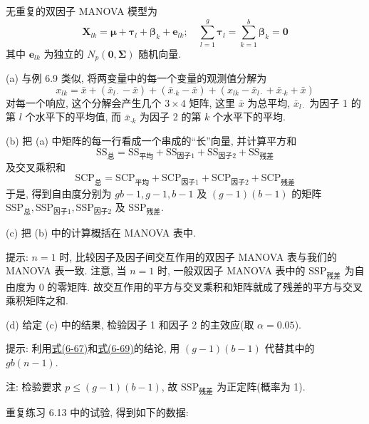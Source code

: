 
无重复的双因子 MANOVA 模型为
\[
\mathbf{X}_{lk}=\boldsymbol{\mu}+\boldsymbol{\tau}_l+\boldsymbol{\beta}_k+\mathbf{e}_{lk};\quad \sum_{l=1}^{g}\boldsymbol{\tau}_l=\sum_{k=1}^{b}\boldsymbol{\beta}_k=\mathbf{0}
\]
其中 $\mathbf{e}_{lk}$ 为独立的 $N_p(\mathbf{0},\boldsymbol{\Sigma})$ 随机向量.

\noindent (a) 与例 6.9 类似, 将两变量中的每一个变量的观测值分解为
\[
x_{lk}=\bar{x}+(\bar{x}_{l\cdot}-\bar{x})+(\bar{x}_{\cdot k}-\bar{x})+(x_{lk}-\bar{x}_{l\cdot}+\bar{x}_{\cdot k}+\bar{x})
\]
对每一个响应, 这个分解会产生几个 $3\times 4$ 矩阵, 这里 $\bar{x}$ 为总平均, $\bar{x}_{l\cdot}$ 为因子 1 的第 $l$ 个水平下的平均值, 而 $\bar{x}_{\cdot k}$ 为因子 2 的第 $k$ 个水平下的平均.

\noindent (b) 把 (a) 中矩阵的每一行看成一个串成的“长”向量, 并计算平方和
\[
\mathrm{SS}_{\text{总}}=\mathrm{SS}_{\text{平均}}+\mathrm{SS}_{\text{因子}1}+\mathrm{SS}_{\text{因子}2}+\mathrm{SS}_{\text{残差}}
\]
及交叉乘积和
\[
\mathrm{SCP}_{\text{总}}=\mathrm{SCP}_{\text{平均}}+\mathrm{SCP}_{\text{因子}1}+\mathrm{SCP}_{\text{因子}2}+\mathrm{SCP}_{\text{残差}}
\]
于是, 得到自由度分别为 $gb-1, g-1, b-1$ 及 $(g-1)(b-1)$ 的矩阵 $\mathrm{SSP}_{\text{总}}, \mathrm{SSP}_{\text{因子}1}, \mathrm{SSP}_{\text{因子}2}$ 及 $\mathrm{SSP}_{\text{残差}}$.

\noindent (c) 把 (b) 中的计算概括在 MANOVA 表中.

\noindent 提示: $n=1$ 时, 比较因子及因子间交互作用的双因子 MANOVA 表与我们的 MANOVA 表一致. 注意, 当 $n=1$ 时, 一般双因子 MANOVA 表中的 $\mathrm{SSP}_{\text{残差}}$ 为自由度为 0 的零矩阵. 故交互作用的平方与交叉乘积和矩阵就成了残差的平方与交叉乘积矩阵之和.

\noindent (d) 给定 (c) 中的结果, 检验因子 1 和因子 2 的主效应(取 $\alpha=0.05$).

\noindent 提示: 利用\hyperref[eq:6-67]{式(6-67)}和\hyperref[eq:6-69]{式(6-69)}的结论, 用 $(g-1)(b-1)$ 代替其中的 $gb(n-1)$.

\noindent 注: 检验要求 $p\le(g-1)(b-1)$, 故 $\mathrm{SSP}_{\text{残差}}$ 为正定阵(概率为 1).

\quad 重复练习 6.13 中的试验, 得到如下的数据:

